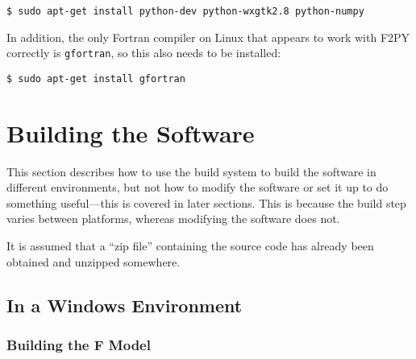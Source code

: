 \begin{lstlisting}
$ sudo apt-get install python-dev python-wxgtk2.8 python-numpy
\end{lstlisting}

In addition, the only Fortran compiler on Linux that appears to work with F2PY correctly is 
\verb|gfortran|, so this also needs to be installed:

\begin{lstlisting}
$ sudo apt-get install gfortran
\end{lstlisting}



\section{Building the Software}
\label{dev:build}

This section describes how to use the build system to build the software in different environments, 
but not how to modify the software or set it up to do something useful---this is covered in later 
sections.  This is because the build step varies between platforms, whereas modifying the software 
does not.

It is assumed that a ``zip file'' containing the source code has already been obtained and unzipped 
somewhere.

\subsection{In a Windows Environment}

\subsubsection{Building the F Model}

